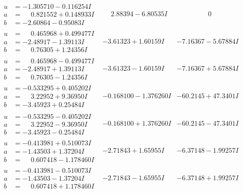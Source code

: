 \documentclass[1p]{elsarticle_modified}
\theoremstyle{definition}
\begin{document}
$$\begin{array}{c|c|c}
\begin{aligned}
u &= -1.305710 - 0.116254 I \\
a &= \phantom{-}0.821552 + 0.148933 I \\
b &= -2.60864 - 0.95083 I\end{aligned}
 & \phantom{-}2.88394 - 6.80535 I & \phantom{-0.000000 } 0 \\ \hline\begin{aligned}
u &= \phantom{-}0.465968 + 0.499477 I \\
a &= -2.48917 - 1.39113 I \\
b &= \phantom{-}0.76305 + 1.24356 I\end{aligned}
 & -3.61323 + 1.60159 I & -7.16367 - 5.67884 I \\ \hline\begin{aligned}
u &= \phantom{-}0.465968 - 0.499477 I \\
a &= -2.48917 + 1.39113 I \\
b &= \phantom{-}0.76305 - 1.24356 I\end{aligned}
 & -3.61323 - 1.60159 I & -7.16367 + 5.67884 I \\ \hline\begin{aligned}
u &= -0.533295 + 0.405202 I \\
a &= \phantom{-}3.22952 + 9.36950 I \\
b &= -3.45923 + 0.25484 I\end{aligned}
 & -0.168100 - 1.376260 I & -60.2145 + 47.3401 I \\ \hline\begin{aligned}
u &= -0.533295 - 0.405202 I \\
a &= \phantom{-}3.22952 - 9.36950 I \\
b &= -3.45923 - 0.25484 I\end{aligned}
 & -0.168100 + 1.376260 I & -60.2145 - 47.3401 I \\ \hline\begin{aligned}
u &= -0.413981 + 0.510073 I \\
a &= -1.43503 + 1.37204 I \\
b &= \phantom{-}0.607418 - 1.178460 I\end{aligned}
 & -2.71843 + 1.65955 I & -6.37148 - 1.99257 I \\ \hline\begin{aligned}
u &= -0.413981 - 0.510073 I \\
a &= -1.43503 - 1.37204 I \\
b &= \phantom{-}0.607418 + 1.178460 I\end{aligned}
 & -2.71843 - 1.65955 I & -6.37148 + 1.99257 I \\ \hline\begin{aligned}

\end{aligned}
\end{array}$$
\end{document}

